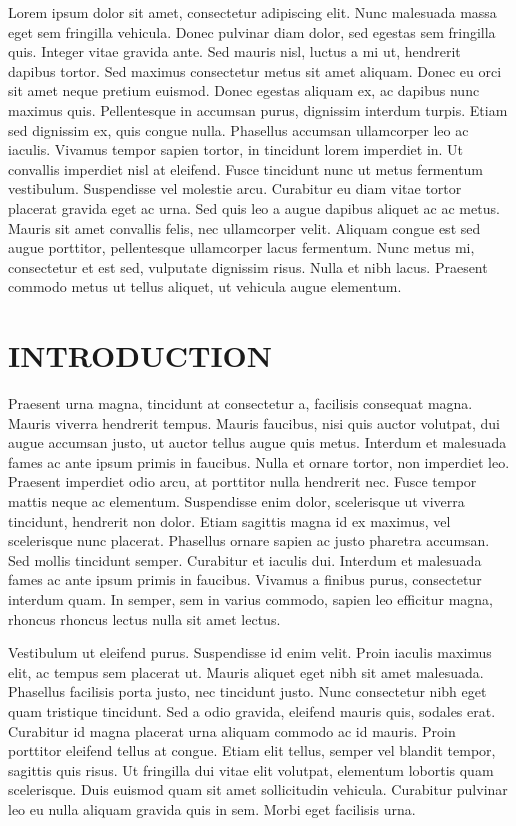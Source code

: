 \documentclass[
  a4paper,
]{scrreprt}
\begin{document}
Lorem ipsum dolor sit amet, consectetur adipiscing elit. Nunc malesuada
massa eget sem fringilla vehicula. Donec pulvinar diam dolor, sed
egestas sem fringilla quis. Integer vitae gravida ante. Sed mauris nisl,
luctus a mi ut, hendrerit dapibus tortor. Sed maximus consectetur metus
sit amet aliquam. Donec eu orci sit amet neque pretium euismod. Donec
egestas aliquam ex, ac dapibus nunc maximus quis. Pellentesque in
accumsan purus, dignissim interdum turpis. Etiam sed dignissim ex, quis
congue nulla. Phasellus accumsan ullamcorper leo ac iaculis. Vivamus
tempor sapien tortor, in tincidunt lorem imperdiet in. Ut convallis
imperdiet nisl at eleifend. Fusce tincidunt nunc ut metus fermentum
vestibulum. Suspendisse vel molestie arcu. Curabitur eu diam vitae
tortor placerat gravida eget ac urna. Sed quis leo a augue dapibus
aliquet ac ac metus. Mauris sit amet convallis felis, nec ullamcorper
velit. Aliquam congue est sed augue porttitor, pellentesque ullamcorper
lacus fermentum. Nunc metus mi, consectetur et est sed, vulputate
dignissim risus. Nulla et nibh lacus. Praesent commodo metus ut tellus
aliquet, ut vehicula augue elementum.

\part{INTRODUCTION}

Praesent urna magna, tincidunt at consectetur a, facilisis consequat
magna. Mauris viverra hendrerit tempus. Mauris faucibus, nisi quis
auctor volutpat, dui augue accumsan justo, ut auctor tellus augue quis
metus. Interdum et malesuada fames ac ante ipsum primis in faucibus.
Nulla et ornare tortor, non imperdiet leo. Praesent imperdiet odio arcu,
at porttitor nulla hendrerit nec. Fusce tempor mattis neque ac
elementum. Suspendisse enim dolor, scelerisque ut viverra tincidunt,
hendrerit non dolor. Etiam sagittis magna id ex maximus, vel scelerisque
nunc placerat. Phasellus ornare sapien ac justo pharetra accumsan. Sed
mollis tincidunt semper. Curabitur et iaculis dui. Interdum et malesuada
fames ac ante ipsum primis in faucibus. Vivamus a finibus purus,
consectetur interdum quam. In semper, sem in varius commodo, sapien leo
efficitur magna, rhoncus rhoncus lectus nulla sit amet lectus.

Vestibulum ut eleifend purus. Suspendisse id enim velit. Proin iaculis
maximus elit, ac tempus sem placerat ut. Mauris aliquet eget nibh sit
amet malesuada. Phasellus facilisis porta justo, nec tincidunt justo.
Nunc consectetur nibh eget quam tristique tincidunt. Sed a odio gravida,
eleifend mauris quis, sodales erat. Curabitur id magna placerat urna
aliquam commodo ac id mauris. Proin porttitor eleifend tellus at congue.
Etiam elit tellus, semper vel blandit tempor, sagittis quis risus. Ut
fringilla dui vitae elit volutpat, elementum lobortis quam scelerisque.
Duis euismod quam sit amet sollicitudin vehicula. Curabitur pulvinar leo
eu nulla aliquam gravida quis in sem. Morbi eget facilisis urna.
\end{document}
